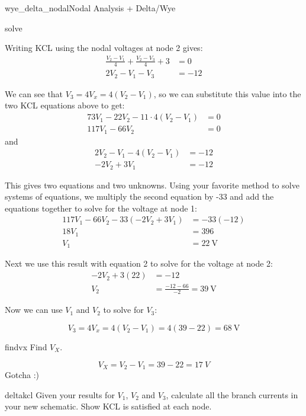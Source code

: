 \begin{mainquestion}{wye_delta_nodal}{Nodal Analysis + Delta/Wye}
\begin{partquestion}{solve}
\begin{answer}
Writing KCL using the nodal voltages at node 2 gives:
\begin{align*}
\frac{V_2-V_1}{4}+\frac{V_2-V_3}{4}+3&=0 \\
2V_2 - V_1 - V_3 &= -12
\end{align*}

We can see that $V_3 = 4V_x = 4(V_2 - V_1)$, so we can substitute this value into the two KCL equations above to get:
\begin{align*}
73V_1 - 22V_2 - 11\cdot 4(V_2 - V_1)&=0 \\
117V_1 - 66V_2 &= 0
\end{align*}
and
\begin{align*}
2V_2 - V_1 - 4(V_2 - V_1) &= -12 \\
-2V_2 + 3V_1 &= -12
\end{align*}

This gives two equations and two unknowns. Using your favorite method to solve systems of equations, we multiply the second equation by -33 and add the equations together to solve for the voltage at node 1:
\begin{align*}
117V_1 - 66V_2 - 33(-2V_2 + 3V_1) &= -33(-12) \\
18V_1 &= 396 \\
V_1 &= \qty{22}{\volt}
\end{align*}

Next we use this result with equation 2 to solve for the voltage at node 2:
\begin{align*}
-2V_2 + 3(22) &= -12 \\
V_2 &= \frac{-12 - 66}{-2} = \qty{39}{\volt}
\end{align*}

Now we can use \(V_1\) and \(V_2\) to solve for \(V_3\):

\[
V_3 = 4V_x = 4(V_2 - V_1) = 4(39 - 22) = \qty{68}{\volt}
\]
\end{answer}
\end{partquestion}

\begin{partquestion}{findvx}
{Find $V_X$.}
\begin{answer}
\[V_X=V_2-V_1=39-22=\qty{17}{V}\]
Gotcha :)
\end{answer}
\end{partquestion}

\begin{partquestion}{deltakcl}
{Given your results for $V_1$, $V_2$ and $V_3$, calculate all the branch currents in your new schematic. Show KCL is satisfied at each node.}


\end{partquestion}
\end{mainquestion}
